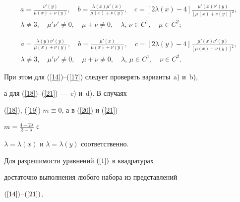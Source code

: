 \begin{equation}\label{20}


\begin{array}{c}


a=\frac{\nu'(y)}{\mu(x)+\nu(y)},\quad


b=\frac{\lambda(x)\mu'(x)}{\mu(x)+\nu(y)},\quad


c=[2\lambda(x)-4]\frac{\mu'(x)\nu'(y)}{[\mu(x)+\nu(y)]^2},\\[3mm]


\lambda\ne3,\quad \mu'\nu'\ne0,\quad \mu+\nu\ne0,\quad


\lambda,\,\nu\in C^1,\quad \mu\in C^2;


\end{array}


\end{equation}


\begin{equation}\label{21}


\begin{array}{c}


a=\frac{\lambda(y)\nu'(y)}{\mu(x)+\nu(y)},\quad


b=\frac{\mu'(x)}{\mu(x)+\nu(y)},\quad


c=[2\lambda(y)-4]\frac{\mu'(x)\nu'(y)}{[\mu(x)+\nu(y)]^2},\\[3mm]


\lambda\ne3,\quad \mu'\nu'\ne0,\quad \mu+\nu\ne0,\quad


\lambda,\,\mu\in C^1,\quad \nu\in C^2.


\end{array}


\end{equation}


При этом для (\ref{14})--(\ref{17}) следует проверять варианты~a) и~b),


а для (\ref{18})--(\ref{21}) ---~c) и~d). В случаях


(\ref{18}), (\ref{19}) $m\equiv 0$, а в (\ref{20}) и (\ref{21})


$m=\frac{4-2\lambda}{3-\lambda}$ с


$\lambda=\lambda(x)$ и $\lambda=\lambda(y)$ соответственно.





\begin{cornonum}


Для разрешимости уравнений $(\ref{1})$ в квадратурах


достаточно выполнения любого набора из представлений


$(\ref{14})$--$(\ref{21})$.


\end{cornonum}





